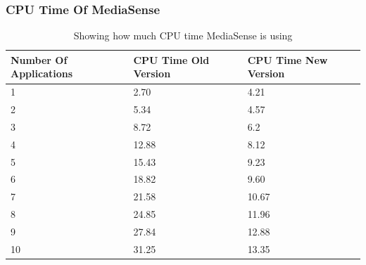\subsubsection{CPU Time Of MediaSense}
\begin{table}[H]
\begin{center}
    \begin{tabular}[t!]{ | l | l | l |}
    \hline
    Number Of Applications								& CPU Time Old Version					& CPU Time New Version\\ \hline
    1 													& 2.70									& 4.21\\ \hline
    2 													& 5.34									& 4.57\\ \hline
    3 													& 8.72									& 6.2\\ \hline
    4 													& 12.88									& 8.12\\ \hline
    5 													& 15.43									& 9.23\\ \hline
    6 													& 18.82									& 9.60\\ \hline
    7 													& 21.58									& 10.67\\ \hline
    8 													& 24.85									& 11.96\\ \hline
    9 													& 27.84									& 12.88	\\ \hline
    10 													& 31.25									& 13.35\\ \hline
    \end{tabular}
    \caption{Showing how much CPU time MediaSense is using}
\end{center}
\end{table}
\clearpage

